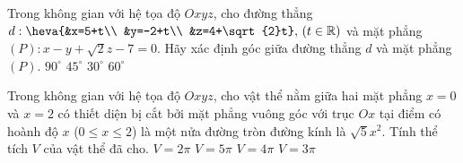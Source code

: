 \begin{ex}%
Trong không gian với hệ tọa độ $Oxyz$, cho đường thẳng $d: \heva{&x=5+t\\ &y=-2+t\\ &z=4+\sqrt{2}t},\, (t\in\mathbb{R})$ và mặt phẳng $(P): x-y+\sqrt{2}z-7=0$. Hãy xác định góc giữa đường thẳng $d$ và mặt phẳng $(P)$.
\choice
{$90^\circ$}
{$45^\circ$}
{\True $30^\circ$}
{$60^\circ$}
\end{ex}

\begin{ex}%
Trong không gian với hệ tọa độ $Oxyz$, cho vật thể nằm giữa hai mặt phẳng $x=0$ và $x=2$ có thiết diện bị cắt bởi mặt phẳng vuông góc với trục $Ox$ tại điểm có hoành độ $x$ ($0\le x\le 2$) là một nửa đường tròn đường kính là $\sqrt{5}x^2$. Tính thể tích $V$ của vật thể đã cho.
\choice
{$V=2\pi$}
{$V=5\pi$}
{\True $V=4\pi$}
{$V=3\pi$}
\end{ex}

